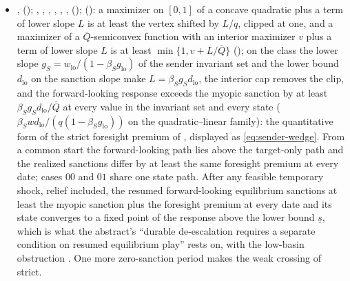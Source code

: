 \begin{itemize}[leftmargin=1.4em,itemsep=1pt]
\item {},  (); , , , , , ,  ();  (): a maximizer on $[0,1]$ of a concave quadratic plus a term of lower slope $L$ is at least the vertex shifted by $L/q$, clipped at one, and a maximizer of a $\bar Q$-semiconvex function with an interior maximizer $v$ plus a term of lower slope $L$ is at least $\min\{1,v+L/\bar Q\}$ (); on the class the lower slope $g_S=w_{\mathrm{lo}}/(1-\beta_S g_{\mathrm{lo}})$ of the sender invariant set and the lower bound $d_{\mathrm{lo}}$ on the sanction slope make $L=\beta_S g_S d_{\mathrm{lo}}$, the interior cap removes the clip, and the forward-looking response exceeds the myopic sanction by at least $\beta_S g_S d_{\mathrm{lo}}/\bar Q$ at every value in the invariant set and every state ($\beta_S w d_{\mathrm{lo}}/(q(1-\beta_S g_{\mathrm{lo}}))$ on the quadratic--linear family): the quantitative form of the strict foresight premium of , displayed as \eqref{eq:sender-wedge}. From a common start the forward-looking path lies above the target-only path and the realized sanctions differ by at least the same foresight premium at every date; cases $00$ and $01$ share one state path. After any feasible temporary shock, relief included, the resumed forward-looking equilibrium sanctions at least the myopic sanction plus the foresight premium at every date and its state converges to a fixed point of the response above the lower bound $\underline s$, which is what the abstract's ``durable de-escalation requires a separate condition on resumed equilibrium play'' rests on, with the low-basin obstruction . One more zero-sanction period makes the weak crossing of  strict.

\end{itemize}
